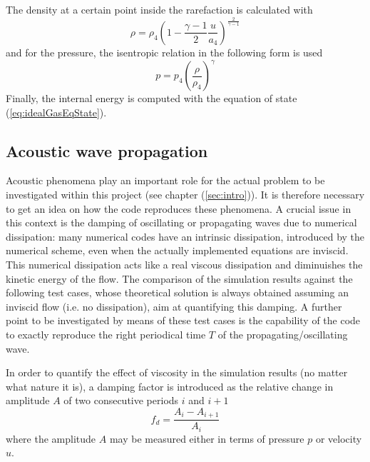 \documentclass{report}
\begin{document}
The density at a certain point inside the rarefaction is calculated with
\begin{equation}
\rho=\rho_4 \left(1-\frac{\gamma-1}{2}\frac{u}{a_4}\right)^\frac{2}{\gamma-1}
\end{equation}
and for the pressure, the isentropic relation in the following form is used
\begin{equation}
p=p_4\left(\frac{\rho}{\rho_4}\right)^\gamma
\end{equation}
Finally, the internal energy is computed with the equation of state (\ref{eq:idealGasEqState}).

\subsection{Acoustic wave propagation}
Acoustic phenomena play an important role for the actual problem to be investigated within this project (see chapter (\ref{sec:intro})). It is therefore necessary to get an idea on how the code reproduces these phenomena. A crucial issue in this context is the damping of oscillating or propagating waves due to numerical dissipation: many numerical codes have an intrinsic dissipation, introduced by the numerical scheme, even when the actually implemented equations are inviscid. This numerical dissipation acts like a real viscous dissipation and diminuishes the kinetic energy of the flow. The comparison of the simulation results against the following test cases, whose theoretical solution is always obtained assuming an inviscid flow (i.e. no dissipation), aim at quantifying this damping. A further point to be investigated by means of these test cases is the capability of the code to exactly reproduce the right periodical time $T$ of the propagating/oscillating wave.
 

In order to quantify the effect of viscosity in the simulation results (no matter what nature it is), a damping factor
is introduced as the relative change in amplitude $A$ of two consecutive periods $i$ and $i+1$
\begin{equation}
 f_d=\frac{A_i-A_{i+1}}{A_i}
\end{equation}
where the amplitude $A$ may be measured either in terms of pressure $p$ or velocity $u$.
\end{document}
